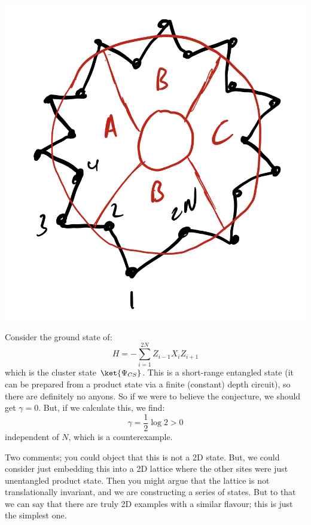 \begin{center}
    \includegraphics[scale=0.35]{Lectures/Images/lec17-TEEcounterexample.png}
\end{center}

Consider the ground state of:
\begin{equation}
    H = -\sum_{i=1}^{2N}Z_{i-1}X_iZ_{i+1}
\end{equation}
which is the cluster state $\ket{\Psi_{CS}}$. This is a short-range entangled state (it can be prepared from a product state via a finite (constant) depth circuit), so there are definitely no anyons. So if we were to believe the conjecture, we should get $\gamma = 0$. But, if we calculate this, we find:
\begin{equation}
    \gamma = \frac{1}{2}\log 2 > 0
\end{equation}
independent of $N$, which is a counterexample.

Two comments; you could object that this is not a 2D state. But, we could consider just embedding this into a 2D lattice where the other sites were just unentangled product state. Then you might argue that the lattice is not translationally invariant, and we are constructing a series of states. But to that we can say that there are truly 2D examples with a similar flavour; this is just the simplest one.

